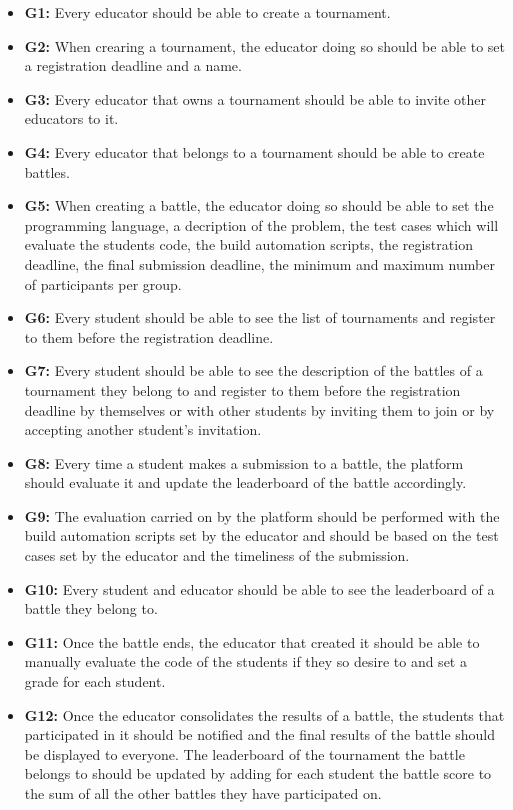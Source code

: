 \documentclass{article}
\begin{document}
\begin{itemize}
    \item \textbf{G1:} Every educator should be able to create a tournament.
    \item \textbf{G2:} When crearing a tournament, the educator doing so should be able to set a registration deadline and a name.
    \item \textbf{G3:} Every educator that owns a tournament should be able to invite other educators to it.
    \item \textbf{G4:} Every educator that belongs to a tournament should be able to create battles.
    \item \textbf{G5:} When creating a battle, the educator doing so should be able to set the programming language, a decription of the problem, the test cases which will evaluate the students code, the build automation scripts, the registration deadline, the final submission deadline, the minimum and maximum number of participants per group.
    \item \textbf{G6:} Every student should be able to see the list of tournaments and register to them before the registration deadline.
    \item \textbf{G7:} Every student should be able to see the description of the battles of a tournament they belong to and register to them before the registration deadline by themselves or with other students by inviting them to join or by accepting another student's invitation.
    \item \textbf{G8:} Every time a student makes a submission to a battle, the platform should evaluate it and update the leaderboard of the battle accordingly.
    \item \textbf{G9:} The evaluation carried on by the platform should be performed with the build automation scripts set by the educator and should be based on the test cases set by the educator and the timeliness of the submission.
    \item \textbf{G10:} Every student and educator should be able to see the leaderboard of a battle they belong to.
    \item \textbf{G11:} Once the battle ends, the educator that created it should be able to manually evaluate the code of the students if they so desire to and set a grade for each student.
    \item \textbf{G12:} Once the educator consolidates the results of a battle, the students that participated in it should be notified and the final results of the battle should be displayed to everyone. The leaderboard of the tournament the battle belongs to should be updated by adding for each student the battle score to the sum of all the other battles they have participated on.

\end{itemize}
\end{document}
